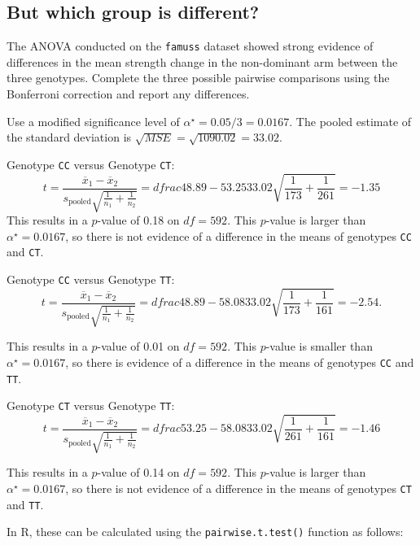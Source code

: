 \documentclass[
  letterpaper,
  DIV=11,
  numbers=noendperiod,
  oneside]{scrreprt}
\newenvironment{Shaded}{\begin{snugshade}}{\end{snugshade}}
\newcommand{\AttributeTok}[1]{\textcolor[rgb]{0.40,0.45,0.13}{#1}}
\newcommand{\FunctionTok}[1]{\textcolor[rgb]{0.28,0.35,0.67}{#1}}
\newcommand{\NormalTok}[1]{\textcolor[rgb]{0.00,0.23,0.31}{#1}}
\newcommand{\SpecialCharTok}[1]{\textcolor[rgb]{0.37,0.37,0.37}{#1}}
\newcommand{\StringTok}[1]{\textcolor[rgb]{0.13,0.47,0.30}{#1}}
\begin{document}
\hypertarget{but-which-group-is-different}{%
\subsection{But which group is
different?}\label{but-which-group-is-different}}

The ANOVA conducted on the \texttt{famuss} dataset showed strong
evidence of differences in the mean strength change in the non-dominant
arm between the three genotypes. Complete the three possible pairwise
comparisons using the Bonferroni correction and report any differences.

Use a modified significance level of \(\alpha^\star = 0.05/3 = 0.0167\).
The pooled estimate of the standard deviation is
\(\sqrt{MSE} = \sqrt{1090.02} = 33.02\).

Genotype \texttt{CC} versus Genotype \texttt{CT}: \[
t = \frac{\overline{x}_1 - \overline{x}_2}{s_{\text{pooled}}\sqrt{\frac{1}{n_1} + \frac{1}{n_2}}} 
 = dfrac{48.89 - 53.25}{33.02 \sqrt{\frac{1}{173} + \frac{1}{261}}} = -1.35
\] This results in a \(p\)-value of 0.18 on \(df =592\). This
\(p\)-value is larger than \(\alpha^\star = 0.0167\), so there is not
evidence of a difference in the means of genotypes \texttt{CC} and
\texttt{CT}.

Genotype \texttt{CC} versus Genotype \texttt{TT}: \[
t = \frac{\overline{x}_1 - \overline{x}_2}{s_{\text{pooled}}\sqrt{\frac{1}{n_1} + \frac{1}{n_2}}}
 = dfrac{48.89 - 58.08}{33.02 \sqrt{\frac{1}{173} + \frac{1}{161}}} = -2.54.
\]

This results in a \(p\)-value of 0.01 on \(df =592\). This \(p\)-value
is smaller than \(\alpha^\star = 0.0167\), so there is evidence of a
difference in the means of genotypes \texttt{CC} and \texttt{TT}.

Genotype \texttt{CT} versus Genotype \texttt{TT}:\\
\[
t = \frac{\overline{x}_1 - \overline{x}_2}{s_{\text{pooled}}\sqrt{\frac{1}{n_1} + \frac{1}{n_2}}}
= dfrac{53.25 - 58.08}{33.02 \sqrt{\frac{1}{261} + \frac{1}{161}}} = -1.46
\]

This results in a \(p\)-value of 0.14 on \(df =592\). This \(p\)-value
is larger than \(\alpha^\star = 0.0167\), so there is not evidence of a
difference in the means of genotypes \texttt{CT} and \texttt{TT}.

In R, these can be calculated using the \texttt{pairwise.t.test()}
function as follows:

\begin{Shaded}
\end{Shaded}
\end{document}
